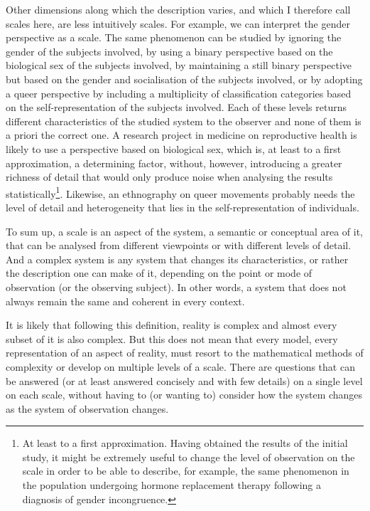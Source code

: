 \documentclass[a4paper, headings=standardclasses]{scrartcl}
\begin{document}
Other dimensions along which the description varies, and which I therefore call scales here, are less intuitively scales.
For example, we can interpret the gender perspective as a scale.
The same phenomenon can be studied by ignoring the gender of the subjects involved, by using a binary perspective based on the biological sex of the subjects involved, by maintaining a still binary perspective but based on the gender and socialisation of the subjects involved, or by adopting a queer perspective by including a multiplicity of classification categories based on the self-representation of the subjects involved.
Each of these levels returns different characteristics of the studied system to the observer and none of them is a priori the correct one.
A research project in medicine on reproductive health is likely to use a perspective based on biological sex, which is, at least to a first approximation, a determining factor, without, however, introducing a greater richness of detail that would only produce noise when analysing the results statistically\footnote{At least to a first approximation. Having obtained the results of the initial study, it might be extremely useful to change the level of observation on the scale in order to be able to describe, for example, the same phenomenon in the population undergoing hormone replacement therapy following a diagnosis of gender incongruence.}.
Likewise, an ethnography on queer movements probably needs the level of detail and heterogeneity that lies in the self-representation of individuals.

To sum up, a scale is an aspect of the system, a semantic or conceptual area of it, that can be analysed from different viewpoints or with different levels of detail.
And a complex system is any system that changes its characteristics, or rather the description one can make of it, depending on the point or mode of observation (or the observing subject). In other words, a system that does not always remain the same and coherent in every context.

It is likely that following this definition, reality is complex and almost every subset of it is also complex. But this does not mean that every model, every representation of an aspect of reality, must resort to the mathematical methods of complexity or develop on multiple levels of a scale.
There are questions that can be answered (or at least answered concisely and with few details) on a single level on each scale, without having to (or wanting to) consider how the system changes as the system of observation changes.
\end{document}
